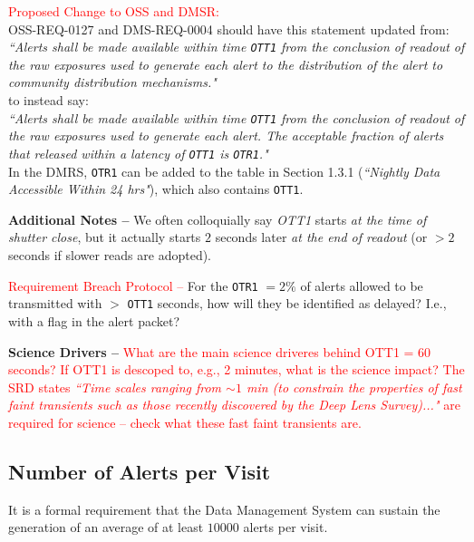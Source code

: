 \documentclass[DM,authoryear,toc]{lsstdoc}
\begin{document}
\textcolor{red}{Proposed Change to OSS and DMSR:} \\
OSS-REQ-0127  and DMS-REQ-0004  should have this statement updated from: \\
{\it ``Alerts shall be made available within time {\tt OTT1} from the conclusion of readout of the raw exposures used to generate each alert to the distribution of the alert to community distribution mechanisms."} \\
to instead say: \\
{\it ``Alerts shall be made available within time {\tt OTT1} from the conclusion of readout of the raw exposures used to generate each alert. The acceptable fraction of alerts that released within a latency of {\tt OTT1} is {\tt OTR1}."}\\
In the DMRS, {\tt OTR1} can be added to the table in Section 1.3.1 ({\it ``Nightly Data Accessible Within 24 hrs"}), which also contains {\tt OTT1}.

{\bf Additional Notes --} We often colloquially say {\it OTT1} starts {\it at the time of shutter close}, but it actually starts $2$ seconds later {\it at the end of readout} (or $>2$ seconds if slower reads are adopted).

\textcolor{red}{Requirement Breach Protocol --} For the {\tt OTR1} $=2\%$ of alerts allowed to be transmitted with $>$ {\tt OTT1} seconds, how will they be identified as delayed? I.e., with a flag in the alert packet?

{\bf Science Drivers --} \textcolor{red}{What are the main science driveres behind OTT1 = 60 seconds? If OTT1 is descoped to, e.g., 2 minutes, what is the science impact? The SRD states {\it ``Time scales ranging from $\sim1$ min (to constrain the properties of fast faint transients such as those recently discovered by the Deep Lens Survey)..."} are required for science -- check what these fast faint transients are.}


\subsection{Number of Alerts per Visit}\label{ssec:transN}

It is a formal requirement that the Data Management System can sustain the generation of an average of at least $10000$ alerts per visit. 
\end{document}
